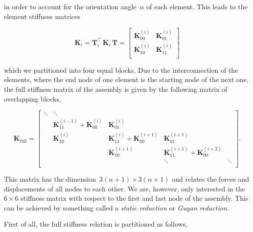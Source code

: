 in order to account for the orientation angle~$\alpha$ of each element.
This leads to the element stiffness matrices

\begin{equation}
\renewcommand\arraystretch{1.5}
\boldsymbol{K}_{i} = \boldsymbol{T}_i^\intercal\,\overline{\boldsymbol{K}}_i\,\boldsymbol{T} =
\begin{bmatrix}
\boldsymbol{K}_{00}^{(i)} & \boldsymbol{K}_{01}^{(i)} \\
\boldsymbol{K}_{10}^{(i)} & \boldsymbol{K}_{11}^{(i)} \\
\end{bmatrix}
\end{equation}

which we partitioned into four equal blocks.
Due to the interconnection of the elements, where the end node of one element is the starting node of the next one, the full stiffness matrix of the assembly is given by the following matrix of overlapping blocks,

\begin{equation}
\renewcommand\arraystretch{1.5}
\boldsymbol{K}_{\mathrm{full}} = \begin{bmatrix}
\ddots & \ddots \\
& \boldsymbol{K}_{11}^{(i-1)} + \boldsymbol{K}_{00}^{(i)} & \boldsymbol{K}_{01}^{(i)} & \\
& \boldsymbol{K}_{10}^{(i)} & \boldsymbol{K}_{11}^{(i)} + \boldsymbol{K}_{00}^{(i+1)} & \boldsymbol{K}_{01}^{(i+1)} \\
&                           & \boldsymbol{K}_{10}^{(i+1)} & \boldsymbol{K}_{11}^{(i+1)} + \boldsymbol{K}_{00}^{(i+2)} \\
&                           &                             &                                          \ddots & \ddots \\
\end{bmatrix}.
\end{equation}

This matrix has the dimension~$3(n+1) \times 3(n+1)$ and relates the forces and displacements of all nodes to each other.
We are, however, only interested in the~$6 \times 6$ stiffness matrix with respect to the first and last node of the assembly.
This can be achieved by something called a \textit{static reduction} or \textit{Guyan reduction}.

First of all, the full stiffness relation is partitioned as follows,

